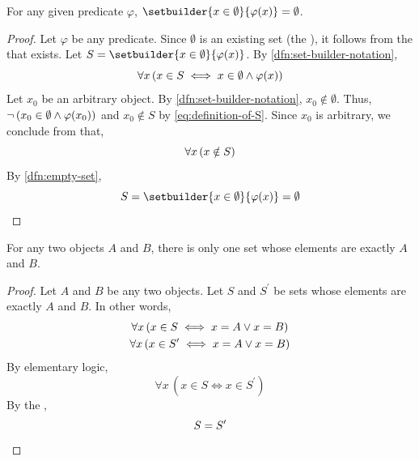 \begin{thm}
    \label{thm:empty-specification}
    For any given predicate \( \varphi \), \( \setbuilder{x \in \emptyset}{\varphi(x)} = \emptyset \).
\end{thm}

\begin{proof}
    Let \( \varphi \) be any predicate. Since \( \emptyset \) is an existing
    set (the ), it follows from the
     that 
    exists. Let \( S = \setbuilder{x \in \emptyset}{\varphi(x)} \).
    By \cref{dfn:set-builder-notation},
    \begin{equation}
        \label{eq:definition-of-S}
        \forall x \, \mleft( x \in S \iff x \in \emptyset \land \varphi(x) \mright)
    \end{equation}
    Let \( x_{0} \) be an arbitrary object. By \cref{dfn:set-builder-notation}, \( x_{0} \notin \emptyset \).
    Thus, \( \lnot \, \mleft(x_{0} \in \emptyset \land \varphi(x_{0})\mright) \) and \( x_{0} \notin S \) by \eqref{eq:definition-of-S}.
    Since \( x_{0} \) is arbitrary, we conclude from  that,
    \begin{equation*}
        \forall x \, \mleft( x \notin S \mright)
    \end{equation*}
    By \cref{dfn:empty-set},
    \begin{equation*}
        S = \setbuilder{x \in \emptyset}{\varphi(x)} = \emptyset \qedhere
    \end{equation*}
\end{proof}

\begin{thm}
    \label{thm:uniqueness-unordered-pair}
    For any two objects \( A \) and \( B \), there is only one set whose elements are exactly \( A \) and \( B \).
\end{thm}

\begin{proof}
    Let \( A \) and \( B \) be any two objects. Let \( S \) and \( S^{\prime} \) be sets whose elements are exactly
    \( A \) and \( B \). In other words,
    \begin{gather*}
        \forall x \, \mleft( x \in S \iff x = A \lor x = B \mright) \\
        \forall x \, \mleft( x \in S^{\prime} \iff x = A \lor x = B \mright)
    \end{gather*}
    By elementary logic,
    \begin{equation*}
        \forall x \, ( x \in S \iff x \in S^{\prime} )
    \end{equation*}
    By the ,
    \begin{equation*}
        S = S^{\prime} \qedhere
    \end{equation*}
\end{proof}

